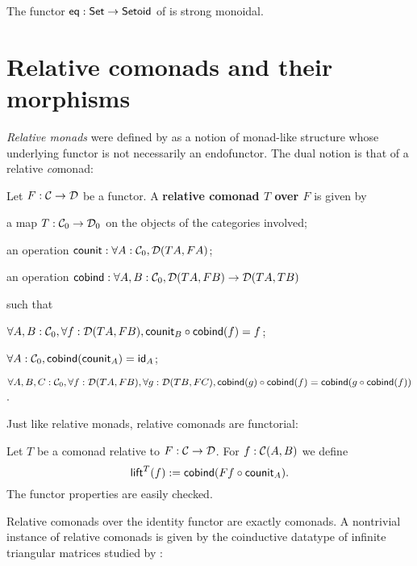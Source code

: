 \documentclass{amsart}
\newcommand{\fat}[1]{\textbf{#1}}
\begin{document}
\begin{example}
  The functor $\eq: \Set \to \Setoid$ of  is strong monoidal.
\end{example}


\section{Relative comonads and their morphisms}\label{sec:comonads}

\emph{Relative monads} were defined by \textcite{DBLP:conf/fossacs/AltenkirchCU10} as a notion of monad-like structure
whose underlying functor is not necessarily an endofunctor.
The dual notion is that of a relative \emph{co}monad:

\begin{definition}\label{def:rel_comonad}
  Let $F:\C\to\D$ be a functor. A \fat{relative comonad $T$ over $F$} is given by
  \begin{packitem}
   \item a map $T:\C_0 \to \D_0$ on the objects of the categories involved;
   \item an operation $\counit : \forall A : \C_0, \D(TA,FA)$;
   \item an operation $\cobind: \forall A,B:\C_0, \D(TA,FB) \to \D(TA,TB)$
  \end{packitem}
  such that 
  \begin{packitem}
   \item $\forall A,B:\C_0, \forall f:\D(TA,FB), \comp{\cobind(f)}{\counit_B} = f$;
   \item $\forall A : \C_0, \cobind(\counit_A) = \id_A$;
   \item $\forall A,B,C:\C_0, \forall f : \D(TA,FB),\forall g:\D(TB,FC), \\
        \comp{\cobind(f)}{\cobind(g)} = \cobind(\comp{\cobind(f)}{g})$.
  \end{packitem} 
\end{definition}
Just like relative monads, relative comonads are functorial:
\begin{definition}\label{def:lift}
 Let $T$ be a  comonad relative to $F:\C\to\D$.
 For $f : \C(A,B)$ we define
  \[ \lift^T(f) := \cobind(\comp{\counit_A}{Ff}) .  \]
 The functor properties are easily checked.
\end{definition}
Relative comonads over the identity functor are exactly comonads.
A nontrivial instance of relative comonads is given by the coinductive datatype of infinite triangular matrices
studied by \textcite{DBLP:conf/types/MatthesP11}:
\end{document}
